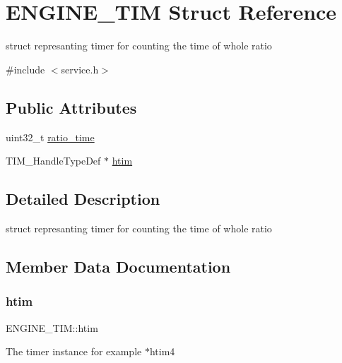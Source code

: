 \hypertarget{struct_e_n_g_i_n_e___t_i_m}{}\section{E\+N\+G\+I\+N\+E\+\_\+\+T\+IM Struct Reference}
\label{struct_e_n_g_i_n_e___t_i_m}


struct represanting timer for counting the time of whole ratio  




{\ttfamily \#include $<$service.\+h$>$}

\subsection*{Public Attributes}
\begin{DoxyCompactItemize}
\item 
uint32\+\_\+t \mbox{\hyperlink{struct_e_n_g_i_n_e___t_i_m_a95cf5aa7e6af5d643323cce7724a29f4}{ratio\+\_\+time}}
\item 
T\+I\+M\+\_\+\+Handle\+Type\+Def $\ast$ \mbox{\hyperlink{struct_e_n_g_i_n_e___t_i_m_aa5e929fb69a4cfa4496706bf4bd02669}{htim}}
\end{DoxyCompactItemize}


\subsection{Detailed Description}
struct represanting timer for counting the time of whole ratio 

\subsection{Member Data Documentation}
\mbox{\label{struct_e_n_g_i_n_e___t_i_m_aa5e929fb69a4cfa4496706bf4bd02669}} 
\subsubsection{\texorpdfstring{htim}{htim}}
{\footnotesize\ttfamily E\+N\+G\+I\+N\+E\+\_\+\+T\+I\+M\+::htim}

The timer instance for example $\ast$htim4 \mbox{\label{struct_e_n_g_i_n_e___t_i_m_a95cf5aa7e6af5d643323cce7724a29f4}} 
